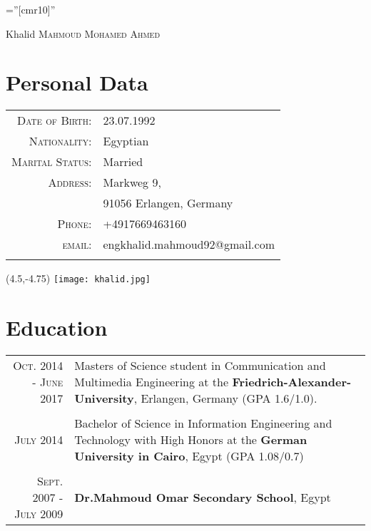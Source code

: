 \documentclass[a4paper,10pt]{article}
\begin{document}

\pagestyle{empty} %

\font\fb=''[cmr10]'' %

\par{\centering
		{\Huge Khalid \textsc{Mahmoud Mohamed Ahmed}
	}\bigskip\par}

\section{Personal Data}
\begin{tabular}{rl}
    \textsc{Date of Birth:} & 23.07.1992   \\
		\textsc{Nationality:} & Egyptian  \\ 
    \textsc{Marital Status:} & Married  \\
    \textsc{Address:}   & Markweg 9,  \\
    & 91056 Erlangen, Germany  \\
    \textsc{Phone:}     & +4917669463160 \\
    \textsc{email:}     & engkhalid.mahmoud92@gmail.com \\
    &
\end{tabular}
\begin{textblock}{2.5}(4.5,-4.75)
	\texttt{[image: khalid.jpg]}
\end{textblock}
\section{Education}
\begin{tabular}{r|p{9cm}}	
\textsc{Oct.} 2014 - \textsc{June} 2017 & Masters of Science student in Communication and Multimedia Engineering at the {\bf Friedrich-Alexander-University}, Erlangen, Germany (GPA 1.6/1.0). \\
& \\

 \textsc{July} 2014 & Bachelor of Science in Information Engineering and Technology with High Honors at the {\bf German University in Cairo}, Egypt (GPA 1.08/0.7)\\
& \\
 \textsc{Sept.} 2007 - \textsc{July} 2009 & {\bf Dr.Mahmoud Omar Secondary School}, Egypt
\end{tabular}
\end{document}

